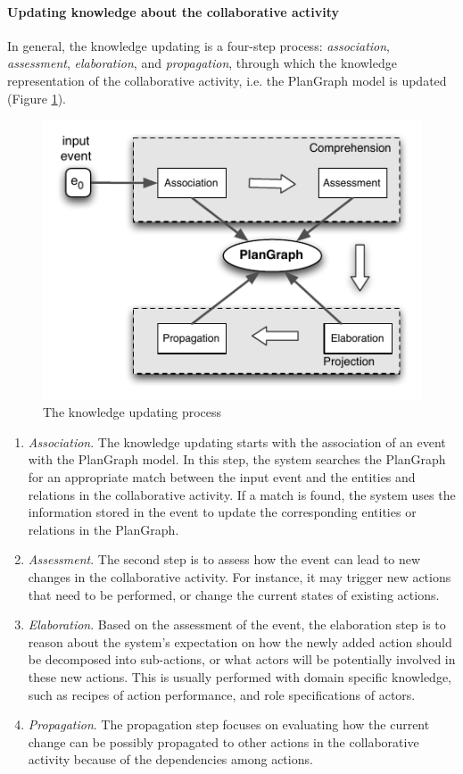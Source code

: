 \paragraph*{Updating knowledge about the collaborative activity} %
\label{par:updating_the_plangraph}
In general, the knowledge updating is a four-step process: \emph{association}, \emph{assessment}, \emph{elaboration}, and \emph{propagation}, through which the knowledge representation of the collaborative activity, i.e. the PlanGraph model is updated (Figure \ref{fig:updating_plangraph}).
\begin{figure}[htbp] %
	\centering
	\includegraphics{updating_plangraph.pdf} 
	\caption{The knowledge updating process}
	\label{fig:updating_plangraph}
\end{figure}

\begin{enumerate}
	\item \emph{Association}. The knowledge updating starts with the association of an event with the PlanGraph model. In this step, the system searches the PlanGraph for an appropriate match between the input event and the entities and relations in the collaborative activity. If a match is found, the system uses the information stored in the event to update the corresponding entities or relations in the PlanGraph.
	\item \emph{Assessment}. The second step is to assess how the event can lead to new changes in the collaborative activity. For instance, it may trigger new actions that need to be performed, or change the current states of existing actions. 
	\item \emph{Elaboration}. Based on the assessment of the event, the elaboration step is to reason about the system's expectation on how the newly added action should be decomposed into sub-actions, or what actors will be potentially involved in these new actions. This is usually performed with domain specific knowledge, such as recipes of action performance, and role specifications of actors.
	\item \emph{Propagation}. The propagation step focuses on evaluating how the current change can be possibly propagated to other actions in the collaborative activity because of the dependencies among actions. 
\end{enumerate}

